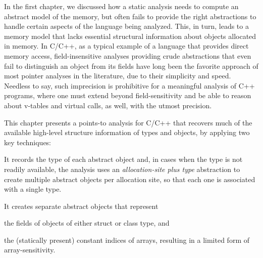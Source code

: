\label{chapter:structsens}

In the first chapter, we discussed how a static analysis needs to
compute an abstract model of the memory, but often fails to provide
the right abstractions to handle certain aspects of the language being
analyzed. This, in turn, leads to a memory model that lacks essential
structural information about objects allocated in memory. In C/C++, as
a typical example of a language that provides direct memory access,
field-insensitive analyses providing crude abstractions that even fail
to distinguish an object from its fields have long been the favorite
approach of most pointer analyses in the literature, due to their
simplicity and speed.
%
Needless to say, such imprecision is prohibitive for a meaningful
analysis of C++ programs, where one must extend beyond
field-sensitivity and be able to reason about v-tables and virtual
calls, as well, with the utmost precision.

This chapter presents a points-to analysis for C/C++ that recovers
much of the available high-level structure information of types and
objects, by applying two key techniques:
\begin{inparaenum}[(1)]
\item It records the type of each abstract object and, in cases
  when the type is not readily available, the analysis uses an
  \emph{allocation-site plus type} abstraction to create multiple
  abstract objects per allocation site, so that each one is
  associated with a single type.
\item It creates separate abstract objects that represent
  \begin{inparaenum}[(a)]
  \item the fields of objects of either struct or class type, and
  \item the (statically present) constant indices of arrays,
    resulting in a limited form of array-sensitivity.
  \end{inparaenum}
\end{inparaenum}





